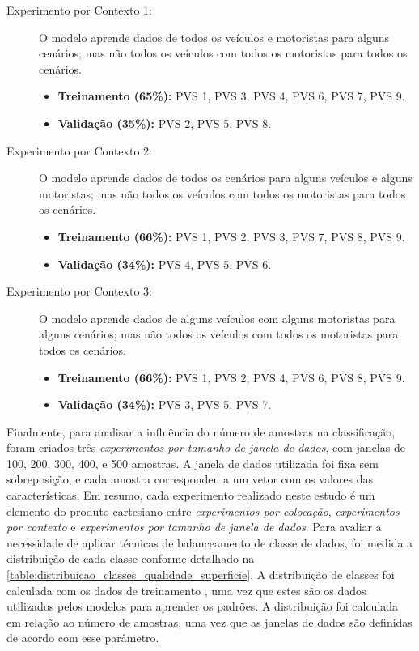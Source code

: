 \begin{description}
	
	\item[Experimento por Contexto 1:] O modelo aprende dados de todos os veículos e motoristas para alguns cenários; mas não todos os veículos com todos os motoristas para todos os cenários.
    \begin{itemize}
        \item \textbf{Treinamento (65\%):} PVS 1, PVS 3, PVS 4, PVS 6, PVS 7, PVS 9. 
        \item \textbf{Validação (35\%):} PVS 2, PVS 5, PVS 8.
    \end{itemize}
    
    \item[Experimento por Contexto 2:] O modelo aprende dados de todos os cenários para alguns veículos e alguns motoristas; mas não todos os veículos com todos os motoristas para todos os cenários.
    \begin{itemize}
        \item \textbf{Treinamento (66\%):} PVS 1, PVS 2, PVS 3, PVS 7, PVS 8, PVS 9.
        \item \textbf{Validação (34\%):} PVS 4, PVS 5, PVS 6.
    \end{itemize}
    
    \item[Experimento por Contexto 3:] O modelo aprende dados de alguns veículos com alguns motoristas para alguns cenários; mas não todos os veículos com todos os motoristas para todos os cenários.
    \begin{itemize}
        \item \textbf{Treinamento (66\%):} PVS 1, PVS 2, PVS 4, PVS 6, PVS 8, PVS 9.
        \item \textbf{Validação (34\%):} PVS 3, PVS 5, PVS 7.
    \end{itemize}
    
\end{description}

Finalmente, para analisar a influência do número de amostras na classificação, foram criados três \emph{experimentos por tamanho de janela de dados}, com janelas de 100, 200, 300, 400, e 500 amostras. A janela de dados utilizada foi fixa sem sobreposição, e cada amostra correspondeu a um vetor com os valores das características. Em resumo, cada experimento realizado neste estudo é um elemento do produto cartesiano entre \emph{experimentos por colocação}, \emph{experimentos por contexto} e \emph{experimentos por tamanho de janela de dados}. Para avaliar a necessidade de aplicar técnicas de balanceamento de classe de dados, foi medida a distribuição de cada classe conforme detalhado na \autoref{table:distribuicao_classes_qualidade_superficie}. A distribuição de classes foi calculada com os dados de treinamento \cite{He2013,Kuhn2013}, uma vez que estes são os dados utilizados pelos modelos para aprender os padrões. A distribuição foi calculada em relação ao número de amostras, uma vez que as janelas de dados são definidas de acordo com esse parâmetro.

